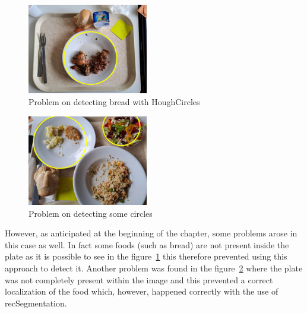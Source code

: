 \documentclass[
	a4paper, %
	10pt, %
	unnumberedsections, %
	twoside, %
]{LTJournalArticle}
\begin{document}
\begin{figure}[t]
    \centering
    \includegraphics[width=0.47\textwidth]{Images/CircBoxes_tray5.3.jpg}
    \caption{Problem on detecting bread with HoughCircles}
    \label{fig:CircBoxes_tray5.3}
\end{figure}

\begin{figure}[t]
    \centering
    \includegraphics[width=0.47\textwidth]{Images/CircBoxes_tray4.2.jpg}
    \caption{Problem on detecting some circles}
    \label{fig:CircBoxes_tray4.2}
\end{figure}

However, as anticipated at the beginning of the chapter, some problems arose in this case as well. In fact some foods (such as bread) are not present inside the plate as it is possible to see in the figure~\ref{fig:CircBoxes_tray5.3} this therefore prevented using this approach to detect it. Another problem was found in the figure~\ref{fig:CircBoxes_tray4.2} where the plate was not completely present within the image and this prevented a correct localization of the food which, however, happened correctly with the use of recSegmentation.
\end{document}
